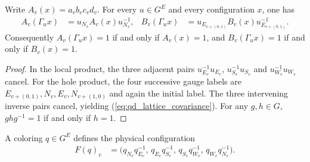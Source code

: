 \begin{lemma}
    \label{lem:peps_qd_lattice_holonomy_covariance}
    Write $A_v(x)=a_vb_vc_vd_v$.
    For every $u\in G^E$ and every configuration $x$, one has
    \begin{align}
        A_v(\Gamma_u x)&=u_{N_v}A_v(x)u_{N_v}^{-1},
        & B_v(\Gamma_u x)&=u_{E_{v+(0,1)}}B_v(x)u_{E_{v+(0,1)}}^{-1}.
        \label{eq:qd_lattice_covariance}
    \end{align}
    Consequently $A_v(\Gamma_u x)=1$ if and only if $A_v(x)=1$, and $B_v(\Gamma_u x)=1$ if and only if $B_v(x)=1$.
\end{lemma}
\begin{proof}
    In the local product, the three adjacent pairs $u_{E_v}^{-1}u_{E_v}$, $u_{S_v}^{-1}u_{S_v}$ and $u_{W_v}^{-1}u_{W_v}$ cancel.
    For the hole product, the four successive gauge labels are $E_{v+(0,1)},N_v,E_v,N_{v+(1,0)}$ and again the initial label.
    The three intervening inverse pairs cancel, yielding (\ref{eq:qd_lattice_covariance}).
    For any $g,h\in G$, $ghg^{-1}=1$ if and only if $h=1$.
\end{proof}

\begin{definition}
    \label{def:peps_qd_lattice_spins}
    A coloring $q\in G^E$ defines the physical configuration
    \begin{align}
        F(q)_v&=\bigl(q_{N_v}q_{E_v}^{-1},\,
        q_{E_v}q_{S_v}^{-1},\,
        q_{S_v}q_{W_v}^{-1},\,
        q_{W_v}q_{N_v}^{-1}\bigr).
        \label{eq:qd_lattice_spins}
    \end{align}
\end{definition}

